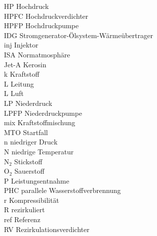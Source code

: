 \begin{tabbing}
    HP      \>  Hochdruck                                           \\
    HPFC    \>  Hochdruckverdichter                                 \\
    HPFP    \>  Hochdruckpumpe                                      \\
    IDG     \>  Stromgenerator-Ölsystem-Wärmeübertrager             \\
    inj     \>  Injektor                                            \\
    ISA     \>  Normatmosphäre                                      \\
    Jet-A   \>  Kerosin                                             \\
    k       \>  Kraftstoff                                          \\
    L       \>  Leitung                                             \\
    L       \>  Luft                                                \\
    LP      \>  Niederdruck                                         \\
    LPFP    \>  Niederdruckpumpe                                    \\
    mix     \>  Kraftstoffmischung                                  \\
    MTO     \>  Startfall                                           \\
    n       \>  niedriger Druck                                     \\
    N       \>  niedrige Temperatur                                 \\
    N$_2$   \>  Stickstoff                                          \\
    O$_2$   \>  Sauerstoff                                          \\
    P       \>  Leistungsentnahme                                   \\
    PHC     \>  parallele Wasserstoffverbrennung                    \\
    r       \>  Kompressibilität                                    \\
    R       \>  rezirkuliert                                        \\
    ref     \>  Referenz                                            \\
    RV      \>  Rezirkulationsverdichter                            \\

\end{tabbing}
